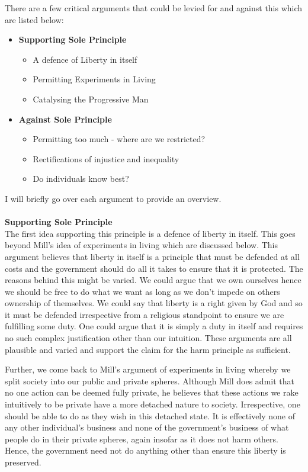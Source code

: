\documentclass[12pt, letterpaper]{article}
\begin{document}
There are a few critical arguments that could be levied for and against this which are listed below:
\begin{itemize}
	\item \textbf{Supporting Sole Principle}
		\begin{itemize}
			\item A defence of Liberty in itself
			\item Permitting Experiments in Living
			\item Catalysing the Progressive Man
		\end{itemize}
	\item \textbf{Against Sole Principle}
		\begin{itemize}
			\item Permitting too much - where are we restricted?
			\item Rectifications of injustice and inequality
			\item Do individuals know best?
		\end{itemize}
\end{itemize}
I will briefly go over each argument to provide an overview.
\\\\
\textbf{Supporting Sole Principle}
\\
The first idea supporting this principle is a defence of liberty in itself. This goes beyond Mill's idea of experiments in living which are discussed below. This argument believes that liberty in itself is a principle that must be defended at all costs and the government should do all it takes to ensure that it is protected. The reasons behind this might be varied. We could argue that we own ourselves hence we should be free to do what we want as long as we don't impede on others ownership of themselves. We could say that liberty is a right given by God and so it must be defended irrespective from a religious standpoint to ensure we are fulfilling some duty. One could argue that it is simply a duty in itself and requires no such complex justification other than our intuition. These arguments are all plausible and varied and support the claim for the harm principle as sufficient.

Further, we come back to Mill's argument of experiments in living whereby we split society into our public and private spheres. Although Mill does admit that no one action can be deemed fully private, he believes that these actions we rake intuitively to be private have a more detached nature to society. Irrespective, one should be able to do as they wish in this detached state. It is effectively none of any other individual's business and none of the government's business of what people do in their private spheres, again insofar as it does not harm others. Hence, the government need not do anything other than ensure this liberty is preserved.
\end{document}

